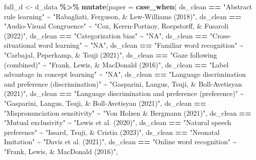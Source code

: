 \documentclass[
]{article}
\newenvironment{Shaded}{\begin{snugshade}}{\end{snugshade}}
\newcommand{\AttributeTok}[1]{\textcolor[rgb]{0.13,0.29,0.53}{#1}}
\newcommand{\FunctionTok}[1]{\textcolor[rgb]{0.13,0.29,0.53}{\textbf{#1}}}
\newcommand{\NormalTok}[1]{#1}
\newcommand{\OtherTok}[1]{\textcolor[rgb]{0.56,0.35,0.01}{#1}}
\newcommand{\SpecialCharTok}[1]{\textcolor[rgb]{0.81,0.36,0.00}{\textbf{#1}}}
\newcommand{\StringTok}[1]{\textcolor[rgb]{0.31,0.60,0.02}{#1}}
\begin{document}
\begin{Shaded}
\begin{Highlighting}[]
\NormalTok{full\_d }\OtherTok{\textless{}{-}}\NormalTok{ d\_data }\SpecialCharTok{\%\textgreater{}\%} 
  \FunctionTok{mutate}\NormalTok{(}\AttributeTok{paper =} \FunctionTok{case\_when}\NormalTok{(}
\NormalTok{    ds\_clean }\SpecialCharTok{==} \StringTok{"Abstract rule learning"} \SpecialCharTok{\textasciitilde{}} \StringTok{"Rabagliati, Ferguson, \& Lew{-}Williams (2018)"}\NormalTok{, }
\NormalTok{    ds\_clean }\SpecialCharTok{==} \StringTok{"Audio{-}Visual Congruence"} \SpecialCharTok{\textasciitilde{}} \StringTok{"Cox, Keren{-}Portnoy, Roepstorff, \& Fusaroli (2022)"}\NormalTok{,}
\NormalTok{    ds\_clean }\SpecialCharTok{==} \StringTok{"Categorization bias"} \SpecialCharTok{\textasciitilde{}} \StringTok{"NA"}\NormalTok{, }
\NormalTok{    ds\_clean }\SpecialCharTok{==} \StringTok{"Cross{-}situational word learning"} \SpecialCharTok{\textasciitilde{}} \StringTok{"NA"}\NormalTok{, }
\NormalTok{    ds\_clean }\SpecialCharTok{==} \StringTok{"Familiar word recognition"} \SpecialCharTok{\textasciitilde{}} \StringTok{"Carbajal, Peperkamp, \& Tsuji (2021)"}\NormalTok{, }
\NormalTok{    ds\_clean }\SpecialCharTok{==} \StringTok{"Gaze following (combined)"} \SpecialCharTok{\textasciitilde{}} \StringTok{"Frank, Lewis, \& MacDonald (2016)"}\NormalTok{, }
\NormalTok{    ds\_clean }\SpecialCharTok{==} \StringTok{"Label advantage in concept learning"} \SpecialCharTok{\textasciitilde{}} \StringTok{"NA"}\NormalTok{,}
\NormalTok{    ds\_clean }\SpecialCharTok{==} \StringTok{"Language discrimination and preference (discrimination)"} \SpecialCharTok{\textasciitilde{}} \StringTok{"Gasparini, Langus, Tsuji, \& Boll{-}Avetisyan (2021)"}\NormalTok{, }
\NormalTok{    ds\_clean }\SpecialCharTok{==} \StringTok{"Language discrimination and preference (preference)"} \SpecialCharTok{\textasciitilde{}} \StringTok{"Gasparini, Langus, Tsuji, \& Boll{-}Avetisyan (2021)"}\NormalTok{, }
\NormalTok{    ds\_clean }\SpecialCharTok{==} \StringTok{"Mispronunciation sensitivity"} \SpecialCharTok{\textasciitilde{}} \StringTok{"Von Holzen \& Bergmann (2021)"}\NormalTok{, }
\NormalTok{    ds\_clean }\SpecialCharTok{==} \StringTok{"Mutual exclusivity"} \SpecialCharTok{\textasciitilde{}} \StringTok{"Lewis et al. (2020)"}\NormalTok{, }
\NormalTok{    ds\_clean }\SpecialCharTok{==} \StringTok{"Natural speech preference"} \SpecialCharTok{\textasciitilde{}} \StringTok{"Issard, Tsuji, \& Cristia (2023)"}\NormalTok{, }
\NormalTok{    ds\_clean }\SpecialCharTok{==} \StringTok{"Neonatal Imitation"} \SpecialCharTok{\textasciitilde{}} \StringTok{"Davis et al. (2021)"}\NormalTok{, }
\NormalTok{    ds\_clean }\SpecialCharTok{==} \StringTok{"Online word recognition"} \SpecialCharTok{\textasciitilde{}} \StringTok{"Frank, Lewis, \& MacDonald (2016)"}\NormalTok{, }

\end{Highlighting}
\end{Shaded}
\end{document}
